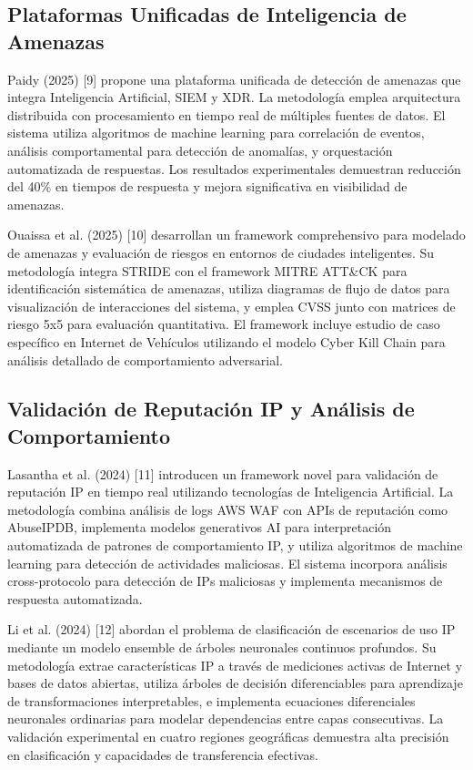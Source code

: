 \subsection{Plataformas Unificadas de Inteligencia de Amenazas}

Paidy (2025) [9] propone una plataforma unificada de detección de amenazas que integra Inteligencia Artificial, SIEM y XDR. La metodología emplea arquitectura distribuida con procesamiento en tiempo real de múltiples fuentes de datos. El sistema utiliza algoritmos de machine learning para correlación de eventos, análisis comportamental para detección de anomalías, y orquestación automatizada de respuestas. Los resultados experimentales demuestran reducción del 40\% en tiempos de respuesta y mejora significativa en visibilidad de amenazas.

Ouaissa et al. (2025) [10] desarrollan un framework comprehensivo para modelado de amenazas y evaluación de riesgos en entornos de ciudades inteligentes. Su metodología integra STRIDE con el framework MITRE ATT\&CK para identificación sistemática de amenazas, utiliza diagramas de flujo de datos para visualización de interacciones del sistema, y emplea CVSS junto con matrices de riesgo 5x5 para evaluación quantitativa. El framework incluye estudio de caso específico en Internet de Vehículos utilizando el modelo Cyber Kill Chain para análisis detallado de comportamiento adversarial.

\subsection{Validación de Reputación IP y Análisis de Comportamiento}

Lasantha et al. (2024) [11] introducen un framework novel para validación de reputación IP en tiempo real utilizando tecnologías de Inteligencia Artificial. La metodología combina análisis de logs AWS WAF con APIs de reputación como AbuseIPDB, implementa modelos generativos AI para interpretación automatizada de patrones de comportamiento IP, y utiliza algoritmos de machine learning para detección de actividades maliciosas. El sistema incorpora análisis cross-protocolo para detección de IPs maliciosas y implementa mecanismos de respuesta automatizada.

Li et al. (2024) [12] abordan el problema de clasificación de escenarios de uso IP mediante un modelo ensemble de árboles neuronales continuos profundos. Su metodología extrae características IP a través de mediciones activas de Internet y bases de datos abiertas, utiliza árboles de decisión diferenciables para aprendizaje de transformaciones interpretables, e implementa ecuaciones diferenciales neuronales ordinarias para modelar dependencias entre capas consecutivas. La validación experimental en cuatro regiones geográficas demuestra alta precisión en clasificación y capacidades de transferencia efectivas.

